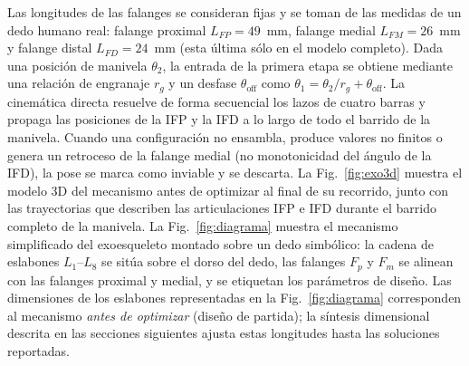 \documentclass[conference]{IEEEtran}
\begin{document}
Las longitudes de las falanges se consideran fijas y se toman de las medidas de
un dedo humano real: falange proximal $L_{FP}=49$~mm, falange medial
$L_{FM}=26$~mm y falange distal $L_{FD}=24$~mm (esta última sólo en el modelo
completo). Dada una posición de manivela $\theta_2$, la entrada de la primera
etapa se obtiene mediante una relación de engranaje $r_g$ y un desfase
$\theta_{\text{off}}$ como $\theta_1=\theta_2/r_g+\theta_{\text{off}}$. La
cinemática directa resuelve de forma secuencial los lazos de cuatro barras y
propaga las posiciones de la IFP y la IFD a lo largo de todo el barrido de la
manivela. Cuando una configuración no ensambla, produce valores no finitos o
genera un retroceso de la falange medial (no monotonicidad del ángulo de la IFD),
la pose se marca como inviable y se descarta. La Fig.~\ref{fig:exo3d} muestra
el modelo 3D del mecanismo antes de optimizar al final de su recorrido, junto con
las trayectorias que describen las articulaciones IFP e IFD durante el barrido
completo de la manivela. La Fig.~\ref{fig:diagrama} muestra
el mecanismo simplificado del exoesqueleto montado sobre un dedo simbólico: la
cadena de eslabones $L_1$--$L_8$ se sitúa sobre el dorso del dedo, las falanges
$F_p$ y $F_m$ se alinean con las falanges proximal y medial, y se etiquetan los
parámetros de diseño. Las dimensiones de los eslabones representadas en la
Fig.~\ref{fig:diagrama} corresponden al mecanismo \emph{antes de optimizar}
(diseño de partida); la síntesis dimensional descrita en las secciones siguientes
ajusta estas longitudes hasta las soluciones reportadas.
\end{document}
